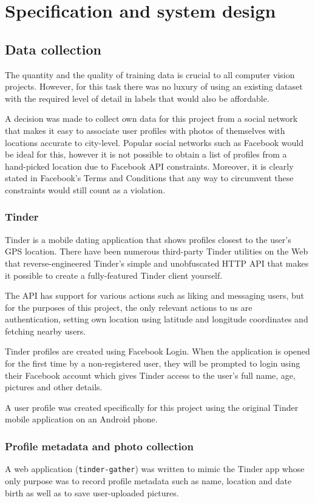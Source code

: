 \chapter{Specification and system design}
\label{spec}
\section{Data collection}
The quantity and the quality of training data is crucial to all computer vision 
projects. However, for this task there was no luxury of using an existing 
dataset with the required level of detail in labels that would also be 
affordable.

A decision was made to collect own data for this project from a social network 
that makes it easy to associate user profiles with photos of themselves with 
locations accurate to city-level. Popular social networks such as Facebook 
would be ideal for this, however it is not possible to obtain a list of 
profiles from a hand-picked location due to Facebook API constraints. 
Moreover, it is clearly stated in Facebook's Terms and Conditions that any way 
to circumvent these constraints would still count as a violation.


\subsection{Tinder}
Tinder is a mobile dating application that shows profiles closest to the 
user's GPS location. There have been numerous third-party Tinder utilities on 
the Web that reverse-engineered Tinder's simple and unobfuscated HTTP API that 
makes it possible to create a fully-featured Tinder client yourself.

The API has support for various actions such as liking and messaging users, 
but for the purposes of this project, the only relevant actions to us are 
authentication, setting own location using latitude and longitude coordinates 
and fetching nearby users.

Tinder profiles are created using Facebook Login. When the application is 
opened for the first time by a non-registered user, they will be prompted to 
login using their Facebook account which gives Tinder access to the user's full name, 
age, pictures and other details.

A user profile was created specifically for this project using the original 
Tinder mobile application on an Android phone. 

\subsection{Profile metadata and photo collection}
A web application (\texttt{tinder-gather}) was written to mimic the Tinder app whose only purpose was 
to record profile metadata such as name, location and date birth as well as 
to save user-uploaded pictures. 

